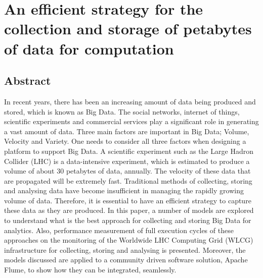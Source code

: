 \chapter{An efficient strategy for the collection and storage of petabytes of data for computation} \label{data-pipe}


\section{Abstract} \label{pipe-abstract}
In recent years, there has been an increasing amount of data being produced and stored, which is known as Big Data. The social networks, internet of things, scientific experiments and commercial services play a significant role in generating a vast amount of data. Three main factors are important in Big Data; Volume, Velocity and Variety. One needs to consider all three factors when designing a platform to support Big Data. A scientific experiment such as the Large Hadron Collider (LHC) is a data-intensive experiment, which is estimated to produce a volume of about 30 petabytes of data, annually. The velocity of these data that are propagated will be extremely fast. Traditional methods of collecting, storing and analysing data have become insufficient in managing the rapidly growing volume of data. Therefore, it is essential to have an efficient strategy to capture these data as they are produced. In this paper, a number of models are explored to understand what is the best approach for collecting and storing Big Data for analytics. Also, performance measurement of full execution cycles of these approaches on the monitoring of the Worldwide LHC Computing Grid (WLCG) infrastructure for collecting, storing and analysing is presented. Moreover, the models discussed are applied to a community driven software solution, Apache Flume, to show how they can be integrated, seamlessly.



